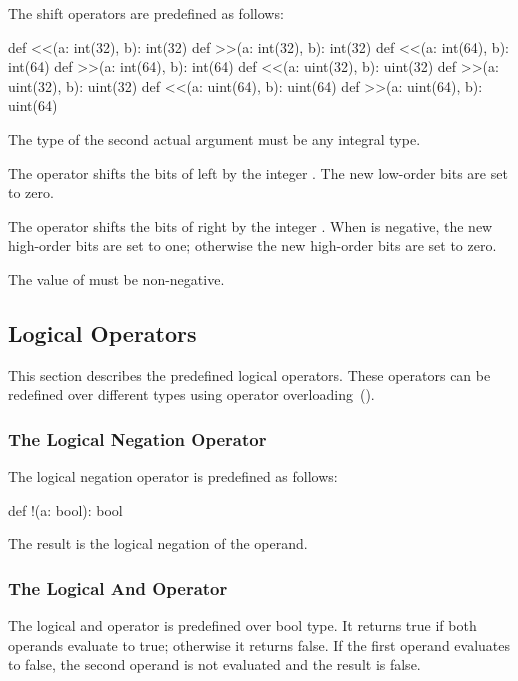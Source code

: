 The shift operators are predefined as follows:
\begin{chapel}
def <<(a: int(32), b): int(32)
def >>(a: int(32), b): int(32)
def <<(a: int(64), b): int(64)
def >>(a: int(64), b): int(64)
def <<(a: uint(32), b): uint(32)
def >>(a: uint(32), b): uint(32)
def <<(a: uint(64), b): uint(64)
def >>(a: uint(64), b): uint(64)
\end{chapel}
The type of the second actual argument must be any integral type.

The \chpl{<<} operator shifts the bits of  left by the
integer .  The new low-order bits are set to zero.

The \chpl{>>} operator shifts the bits of  right by the
integer .  When  is negative, the new high-order bits
are set to one; otherwise the new high-order bits are set to zero.

The value of  must be non-negative.

\subsection{Logical Operators}
\label{Logical_Operators}

This section describes the predefined logical operators.  These
operators can be redefined over different types using operator
overloading~().

\subsubsection{The Logical Negation Operator}
\label{Logical_Negation_Operators}

The logical negation operator is predefined as follows:
\begin{chapel}
def !(a: bool): bool
\end{chapel}
The result is the logical negation of the operand.

\subsubsection{The Logical And Operator}
\label{Logical_And_Operators}

The logical and operator is predefined over bool type.  It returns
true if both operands evaluate to true; otherwise it returns false.
If the first operand evaluates to false, the second operand is not
evaluated and the result is false.

